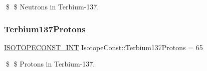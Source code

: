 \$ \$ Neutrons in Terbium-\/137. \mbox{\label{group___isotope_const-_terbium-_tb137_ga20d5455cda80f8869577a7ce15947973}} 
\subsubsection{\texorpdfstring{Terbium137\+Protons}{Terbium137Protons}}
{\footnotesize\ttfamily \mbox{\hyperlink{group___isotope_const-_macros_ga5f18360b3e99483a35c32d789e62621c}{I\+S\+O\+T\+O\+P\+E\+C\+O\+N\+S\+T\+\_\+\+I\+NT}} Isotope\+Const\+::\+Terbium137\+Protons = 65}

\$ \$ Protons in Terbium-\/137. 